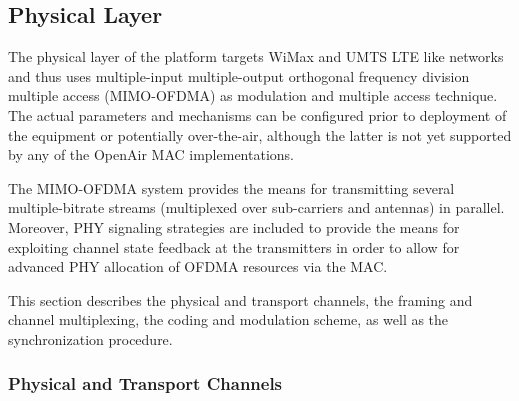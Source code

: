 \documentclass[a4paper,twocolumn,journal]{IEEEtran}
\begin{document}
\subsection{Physical Layer}
\label{sec:phy}

The physical layer of the platform targets WiMax and UMTS LTE like networks and thus uses multiple-input multiple-output orthogonal frequency division multiple access (MIMO-OFDMA) as modulation and multiple access technique. The actual parameters and mechanisms can be configured prior to deployment of the equipment or potentially over-the-air, although the latter is not yet supported by any of the OpenAir MAC implementations.

The MIMO-OFDMA system provides the means for transmitting several multiple-bitrate streams (multiplexed over sub-carriers and antennas) in parallel. Moreover, PHY signaling strategies are included to provide the means for exploiting channel state feedback at the transmitters in order to allow for advanced PHY allocation of OFDMA resources via the MAC.

This section describes the physical and transport channels, the framing and channel multiplexing, the coding and modulation scheme, as well as the synchronization procedure.

\subsubsection{Physical and Transport Channels}
\end{document}

